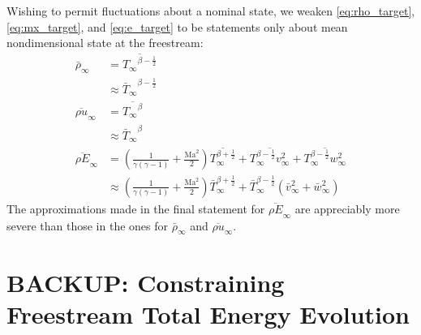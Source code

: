 \documentclass[letterpaper,11pt,nointlimits,reqno]{amsart}
\newcommand{\Mach}[1][]{\mbox{Ma}_{#1}}
\begin{document}
Wishing to permit fluctuations about a nominal state, we weaken
\eqref{eq:rho_target}, \eqref{eq:mx_target}, and \eqref{eq:e_target} to be
statements only about mean nondimensional state at the freestream:
\begin{align}
   \bar{\rho}_\infty &= \overline{{T_\infty}^{\beta-\frac{1}{2}}}
\\
                     &\approx {\bar{T}_\infty}^{\beta-\frac{1}{2}}
\\
  \overline{\rho u}_\infty &= \overline{{T_\infty}^\beta}
\\
                           &\approx {\bar{T}_\infty}^\beta
\\
  \overline{\rho E}_\infty
         &= \left(  \frac{1}{\gamma\left(\gamma-1\right)}
                  + \frac{\Mach^2}{2} \right)
            \overline{T_\infty^{\beta+\frac{1}{2}}}
          + \overline{T_\infty^{\beta-\frac{1}{2}} v_\infty^2}
          + \overline{T_\infty^{\beta-\frac{1}{2}} w_\infty^2}
\\
         &\approx \left(  \frac{1}{\gamma\left(\gamma-1\right)}
                        + \frac{\Mach^2}{2} \right)
            \bar{T}_\infty^{\beta+\frac{1}{2}}
          + \bar{T}_\infty^{\beta-\frac{1}{2}}
            \left(\bar{v}_\infty^2 + \bar{w}_\infty^2\right)
\end{align}
The approximations made in the final statement for $\overline{\rho E}_\infty$
are appreciably more severe than those in the ones for $\bar{\rho}_\infty$ and
$\overline{\rho u}_\infty$.

\section{BACKUP: Constraining Freestream Total Energy Evolution}

\end{document}
